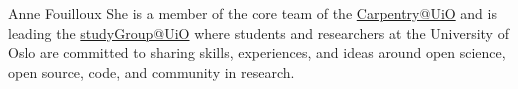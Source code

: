 \begin{participant}[type=R,PM=24,gender=female]{Anne Fouilloux}
  She is a member of the core team of the \href{https://www.uio.no/english/for-employees/support/research/research-data/training/carpentry/}{Carpentry@UiO} and is leading the \href{https://uio-carpentry.github.io/studyGroup/}{studyGroup@UiO} where students and researchers at the University of Oslo are committed to sharing skills, experiences, and ideas around open science, open source, code, and community in research.
\end{participant}

